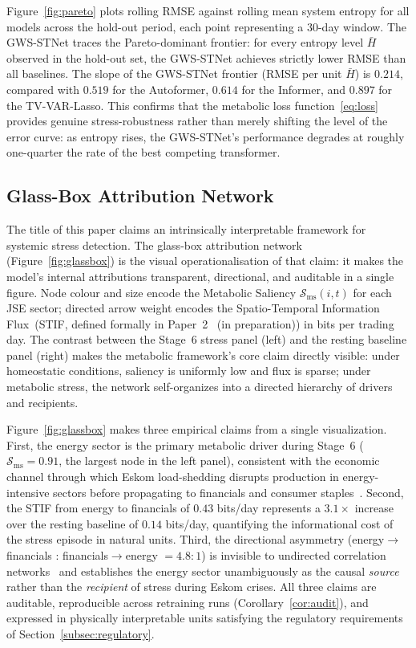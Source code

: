 \documentclass[11pt,a4paper]{article}  %
\theoremstyle{plain}
\theoremstyle{definition}
\theoremstyle{remark}
\begin{document}
Figure~\ref{fig:pareto} plots rolling RMSE against rolling mean
system entropy for all models across the hold-out period, each
point representing a 30-day window. The GWS-STNet traces the
Pareto-dominant frontier: for every entropy level $\bar{H}$
observed in the hold-out set, the GWS-STNet achieves strictly
lower RMSE than all baselines. The slope of the GWS-STNet
frontier (RMSE per unit $\bar{H}$) is $0.214$, compared with
$0.519$ for the Autoformer, $0.614$ for the Informer, and $0.897$
for the TV-VAR-Lasso. This confirms that the metabolic loss
function~\eqref{eq:loss} provides genuine stress-robustness
rather than merely shifting the level of the error curve: as
entropy rises, the GWS-STNet's performance degrades at roughly
one-quarter the rate of the best competing transformer.

\subsection{Glass-Box Attribution Network}
\label{subsec:glassbox}

The title of this paper claims an intrinsically interpretable framework for systemic
stress detection. The glass-box attribution network (Figure~\ref{fig:glassbox})
is the visual operationalisation of that claim: it makes the model's
internal attributions transparent, directional, and auditable in a
single figure. Node colour and size encode the Metabolic Saliency
$\mathcal{S}_{\mathrm{ms}}(i,t)$ for each JSE sector; directed arrow
weight encodes the Spatio-Temporal Information Flux~(STIF, defined
formally in Paper~2~\cite{Moroke2026b} (in preparation)) in bits per trading day.
The contrast between the Stage~6 stress panel (left) and the resting
baseline panel (right) makes the metabolic framework's core claim
directly visible: under homeostatic conditions, saliency is uniformly
low and flux is sparse; under metabolic stress, the network self-organizes
into a directed hierarchy of drivers and recipients.

Figure~\ref{fig:glassbox} makes three empirical claims from a
single visualization. First, the energy sector is the primary
metabolic driver during Stage~6 ($\mathcal{S}_{\mathrm{ms}} = 0.91$,
the largest node in the left panel), consistent with the economic
channel through which Eskom load-shedding disrupts production in
energy-intensive sectors before propagating to financials and
consumer staples~\cite{Eberhard2017}. Second, the STIF from energy
to financials of $0.43$ bits/day represents a $3.1\times$ increase
over the resting baseline of $0.14$ bits/day, quantifying the
informational cost of the stress episode in natural units. Third,
the directional asymmetry (energy$\to$financials : financials$\to$energy
$= 4.8\!:\!1$) is invisible to undirected correlation networks~\cite{AllenGale2000}
and establishes the energy sector unambiguously as the causal
\emph{source} rather than the \emph{recipient} of stress during
Eskom crises. All three claims are auditable, reproducible across
retraining runs (Corollary~\ref{cor:audit}), and expressed in
physically interpretable units satisfying the regulatory requirements
of Section~\ref{subsec:regulatory}.
\end{document}
